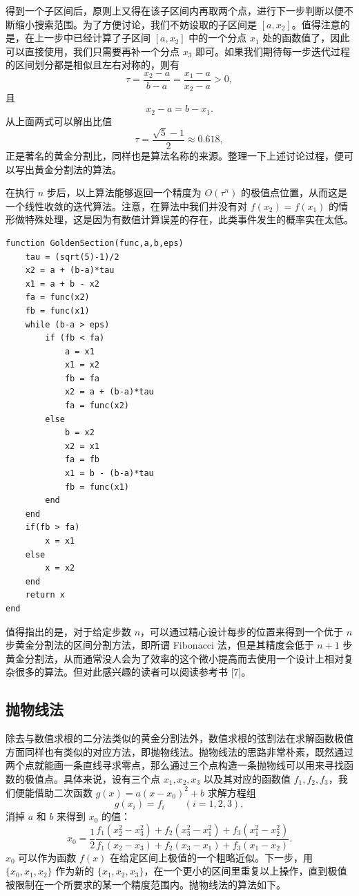 得到一个子区间后，原则上又得在该子区间内再取两个点，进行下一步判断以便不断缩小搜索范围。为了方便讨论，我们不妨设取的子区间是 $[a,x_2]$。值得注意的是，在上一步中已经计算了子区间 $[a,x_2]$ 中的一个分点 $x_1$ 处的函数值了，因此可以直接使用，我们只需要再补一个分点 $x_3$ 即可。如果我们期待每一步迭代过程的区间划分都是相似且左右对称的，则有
\[
\tau=\frac{x_2-a}{b-a}=\frac{x_1-a}{x_2-a}>0,
\]
且
\[
x_2-a=b-x_1.
\]
从上面两式可以解出比值
\[
\tau=\frac{\sqrt5-1}{2}\approx0.618,
\]
正是著名的黄金分割比，同样也是算法名称的来源。整理一下上述讨论过程，便可以写出黄金分割法的算法。

在执行 $n$ 步后，以上算法能够返回一个精度为 $O(\tau^n)$ 的极值点位置，从而这是一个线性收敛的迭代算法。注意，在算法中我们并没有对 $f(x_2)=f(x_1)$ 的情形做特殊处理，这是因为有数值计算误差的存在，此类事件发生的概率实在太低。

\begin{algorithmBox}
\begin{lstlisting}[style=bellacode]
function GoldenSection(func,a,b,eps)
    tau = (sqrt(5)-1)/2
    x2 = a + (b-a)*tau
    x1 = a + b - x2
    fa = func(x2)
    fb = func(x1)
    while (b-a > eps)
        if (fb < fa)
            a = x1
            x1 = x2
            fb = fa
            x2 = a + (b-a)*tau
            fa = func(x2)
        else
            b = x2
            x2 = x1
            fa = fb
            x1 = b - (b-a)*tau
            fb = func(x1)
        end
    end
    if(fb > fa)
        x = x1
    else
        x = x2
    end
    return x
end
\end{lstlisting}
\end{algorithmBox}

值得指出的是，对于给定步数 $n$，可以通过精心设计每步的位置来得到一个优于 $n$ 步黄金分割法的区间分割方法，即所谓 Fibonacci 法，但是其精度会低于 $n+1$ 步黄金分割法，从而通常没人会为了效率的这个微小提高而去使用一个设计上相对复杂很多的算法。但对此感兴趣的读者可以阅读参考书 [7]。

\subsection{抛物线法}

除去与数值求根的二分法类似的黄金分割法外，数值求根的弦割法在求解函数极值方面同样也有类似的对应方法，即抛物线法。抛物线法的思路非常朴素，既然通过两个点就能画一条直线寻求零点，那么通过三个点构造一条抛物线可以用来寻找函数的极值点。具体来说，设有三个点 $x_1,x_2,x_3$ 以及其对应的函数值 $f_1,f_2,f_3$，我们便能借助二次函数 $g(x)=a(x-x_0)^2+b$ 求解方程组
\[
g(x_i)=f_i\qquad(i=1,2,3),
\]
消掉 $a$ 和 $b$ 来得到 $x_0$ 的值：
\[
x_0=\frac12\frac{f_1(x_2^2-x_3^2)+f_2(x_3^2-x_1^2)+f_3(x_1^2-x_2^2)}
{f_1(x_2-x_3)+f_2(x_3-x_1)+f_3(x_1-x_2)}.
\]
$x_0$ 可以作为函数 $f(x)$ 在给定区间上极值的一个粗略近似。下一步，用 $\{x_0,x_1,x_2\}$ 作为新的 $\{x_1,x_2,x_3\}$，在一个更小的区间里重复以上操作，直到极值被限制在一个所要求的某一个精度范围内。抛物线法的算法如下。

